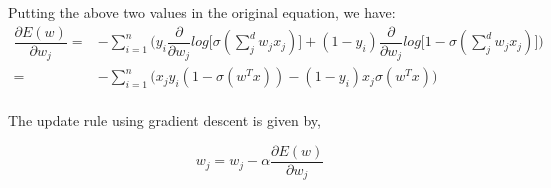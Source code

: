 \documentclass[letterpaper,doc,notimes]{apa6}
\begin{document}
Putting the above two values in the original equation, we have:
\begin{align*}
\dfrac{\partial E(w)}{\partial w_j} = & -\sum_{i=1}^{n} \bigg(
	 y_i \dfrac{\partial}{\partial w_j} log\big[ \sigma(\sum_{j}^{d} w_jx_j) \big] 
	 + (1 - y_i ) \dfrac{\partial}{\partial w_j} log\big[ 1 - \sigma(\sum_{j}^{d} w_jx_j) 
	 \big]\bigg) \\
	 = & -\sum_{i=1}^{n} \bigg(	x_j y_i (1 - \sigma(w^Tx)) - (1 - y_i ) x_j \sigma(w^Tx) \bigg) \\
\end{align*}

The update rule using gradient descent is given by,

\begin{equation*}
	w_j = w_j - \alpha \dfrac{\partial E(w)}{\partial w_j}
\end{equation*}
\end{document}
